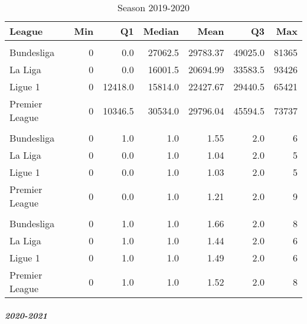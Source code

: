 \documentclass[
]{article}
\begin{document}
\begin{table}

\caption{\label{tab:unnamed-chunk-13}Season 2019-2020}
\centering
\begin{tabular}[t]{lrrrrrr}
\toprule
League & Min & Q1 & Median & Mean & Q3 & Max\\
\midrule
\addlinespace[0.3em]
\multicolumn{7}{l}{\textbf{Attendance}}\\
\hspace{1em}Bundesliga & 0 & 0.0 & 27062.5 & 29783.37 & 49025.0 & 81365\\
\hspace{1em}La Liga & 0 & 0.0 & 16001.5 & 20694.99 & 33583.5 & 93426\\
\hspace{1em}Ligue 1 & 0 & 12418.0 & 15814.0 & 22427.67 & 29440.5 & 65421\\
\hspace{1em}Premier League & 0 & 10346.5 & 30534.0 & 29796.04 & 45594.5 & 73737\\
\addlinespace[0.3em]
\multicolumn{7}{l}{\textbf{Goals away}}\\
\hspace{1em}Bundesliga & 0 & 1.0 & 1.0 & 1.55 & 2.0 & 6\\
\hspace{1em}La Liga & 0 & 0.0 & 1.0 & 1.04 & 2.0 & 5\\
\hspace{1em}Ligue 1 & 0 & 0.0 & 1.0 & 1.03 & 2.0 & 5\\
\hspace{1em}Premier League & 0 & 0.0 & 1.0 & 1.21 & 2.0 & 9\\
\addlinespace[0.3em]
\multicolumn{7}{l}{\textbf{Goals home}}\\
\hspace{1em}Bundesliga & 0 & 1.0 & 1.0 & 1.66 & 2.0 & 8\\
\hspace{1em}La Liga & 0 & 1.0 & 1.0 & 1.44 & 2.0 & 6\\
\hspace{1em}Ligue 1 & 0 & 1.0 & 1.0 & 1.49 & 2.0 & 6\\
\hspace{1em}Premier League & 0 & 1.0 & 1.0 & 1.52 & 2.0 & 8\\
\bottomrule
\end{tabular}
\end{table}

\hypertarget{section-3}{%
\subparagraph{2020-2021}\label{section-3}}
\end{document}
